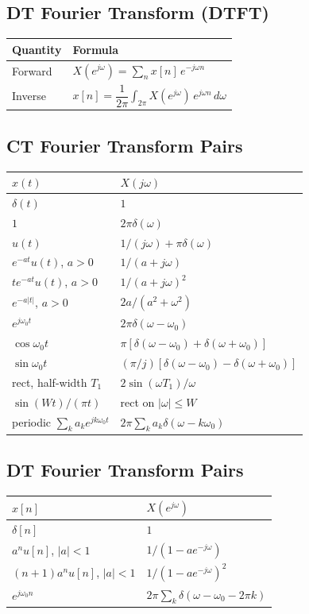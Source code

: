 \documentclass[11pt]{article}
\begin{document}
\subsection{DT Fourier Transform (DTFT)}
\begin{center}
\begin{tabular}{|l|l|}
\hline
Quantity & Formula\\
\hline
Forward & $X(e^{j\omega}) = \sum_n x[n]\, e^{-j\omega n}$\\
Inverse & $x[n] = \dfrac{1}{2\pi}\int_{2\pi} X(e^{j\omega})\, e^{j\omega n}\, d\omega$\\
\hline
\end{tabular}
\end{center}

\subsection{CT Fourier Transform Pairs}
\begin{center}
\begin{tabular}{|l|l|}
\hline
$x(t)$ & $X(j\omega)$\\
\hline
$\delta(t)$ & $1$\\
$1$ & $2\pi\delta(\omega)$\\
$u(t)$ & $1/(j\omega) + \pi\delta(\omega)$\\
$e^{-at}u(t)$, $a>0$ & $1/(a+j\omega)$\\
$te^{-at}u(t)$, $a>0$ & $1/(a+j\omega)^2$\\
$e^{-a|t|}$, $a>0$ & $2a/(a^2+\omega^2)$\\
$e^{j\omega_0 t}$ & $2\pi\delta(\omega-\omega_0)$\\
$\cos\omega_0 t$ & $\pi[\delta(\omega-\omega_0)+\delta(\omega+\omega_0)]$\\
$\sin\omega_0 t$ & $(\pi/j)[\delta(\omega-\omega_0)-\delta(\omega+\omega_0)]$\\
rect, half-width $T_1$ & $2\sin(\omega T_1)/\omega$\\
$\sin(Wt)/(\pi t)$ & rect on $|\omega|\le W$\\
periodic $\sum_k a_k e^{jk\omega_0 t}$ & $2\pi\sum_k a_k\delta(\omega-k\omega_0)$\\
\hline
\end{tabular}
\end{center}

\subsection{DT Fourier Transform Pairs}
\begin{center}
\begin{tabular}{|l|l|}
\hline
$x[n]$ & $X(e^{j\omega})$\\
\hline
$\delta[n]$ & $1$\\
$a^n u[n]$, $|a|<1$ & $1/(1 - a e^{-j\omega})$\\
$(n+1)a^n u[n]$, $|a|<1$ & $1/(1 - a e^{-j\omega})^2$\\
$e^{j\omega_0 n}$ & $2\pi\sum_k \delta(\omega - \omega_0 - 2\pi k)$\\
\hline
\end{tabular}
\end{center}
\end{document}

